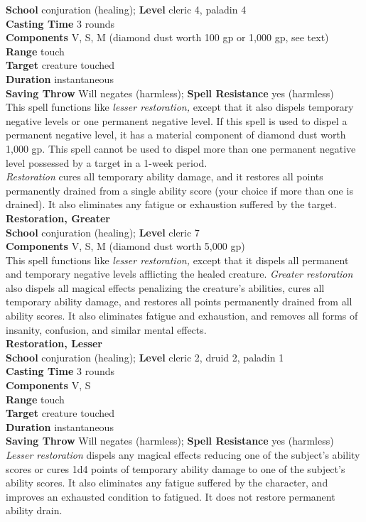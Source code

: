 \textbf{School} conjuration (healing); \textbf{Level} cleric 4, paladin 4\\
\textbf{Casting Time} 3 rounds\\
\textbf{Components} V, S, M (diamond dust worth 100 gp or 1,000 gp, see text)\\
\textbf{Range} touch\\
\textbf{Target} creature touched\\
\textbf{Duration} instantaneous\\
\textbf{Saving Throw} Will negates (harmless); \textbf{Spell Resistance} yes (harmless)\\
This spell functions like \textit{lesser restoration,} except that it also dispels temporary negative levels or one permanent negative level. If this spell is used to dispel a permanent negative level, it has a material component of diamond dust worth 1,000 gp. This spell cannot be used to dispel more than one permanent negative level possessed by a target in a 1-week period.\\
\textit{Restoration} cures all temporary ability damage, and it restores all points permanently drained from a single ability score (your choice if more than one is drained). It also eliminates any fatigue or exhaustion suffered by the target. \\
\textbf{Restoration, Greater}\\
\textbf{School} conjuration (healing); \textbf{Level} cleric 7\\
\textbf{Components} V, S, M (diamond dust worth 5,000 gp)\\
This spell functions like \textit{lesser restoration,} except that it dispels all permanent and temporary negative levels afflicting the healed creature. \textit{Greater restoration} also dispels all magical effects penalizing the creature's abilities, cures all temporary ability damage, and restores all points permanently drained from all ability scores. It also eliminates fatigue and exhaustion, and removes all forms of insanity, confusion, and similar mental effects.\\
\textbf{Restoration, Lesser}\\
\textbf{School} conjuration (healing); \textbf{Level} cleric 2, druid 2, paladin 1\\
\textbf{Casting Time} 3 rounds\\
\textbf{Components} V, S\\
\textbf{Range} touch\\
\textbf{Target} creature touched\\
\textbf{Duration} instantaneous\\
\textbf{Saving Throw }Will negates (harmless); \textbf{Spell Resistance} yes (harmless)\\
\textit{Lesser restoration }dispels any magical effects reducing one of the subject's ability scores or cures 1d4 points of temporary ability damage to one of the subject's ability scores. It also eliminates any fatigue suffered by the character, and improves an exhausted condition to fatigued. It does not restore permanent ability drain.\\
